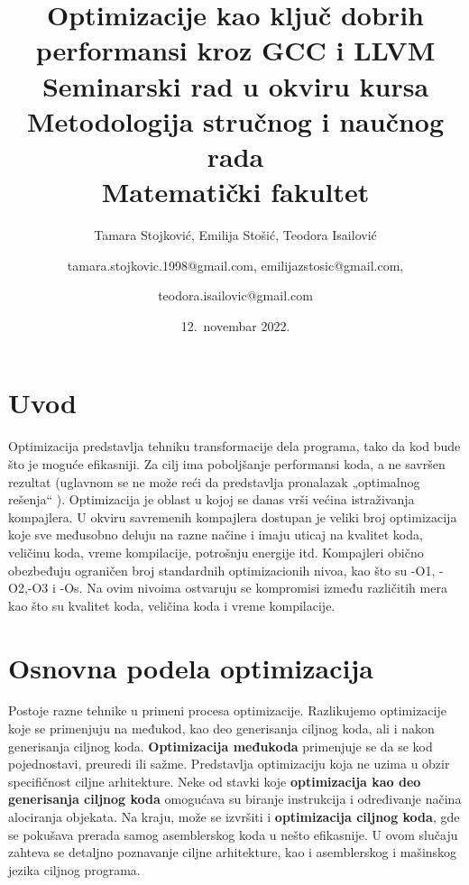 \documentclass[a4paper]{article}
\begin{document}
\title{Optimizacije kao ključ dobrih performansi kroz GCC i LLVM\\ \small{Seminarski rad u okviru kursa\\Metodologija stručnog i naučnog rada\\ Matematički fakultet}}

\author{Tamara Stojković, Emilija Stošić, Teodora Isailović \and tamara.stojkovic.1998@gmail.com, emilijazstosic@gmail.com, \and teodora.isailovic@gmail.com}
\date{12.~novembar 2022.}

\maketitle

\tableofcontents

\newpage

\section{Uvod}
\label{sec:uvod}
Optimizacija predstavlja tehniku transformacije dela programa,  tako da kod bude što je moguće efikasniji. 
Za cilj ima poboljšanje performansi koda, a ne savršen rezultat (uglavnom se ne može reći da predstavlja pronalazak „optimalnog rešenja“ ). 
Optimizacija je oblast u kojoj se danas vrši većina istraživanja kompajlera. 
U okviru savremenih kompajlera dostupan je veliki broj optimizacija koje sve međusobno deluju na razne načine i imaju uticaj na kvalitet koda, veličinu koda, vreme kompilacije, potrošnju energije itd. 
Kompajleri obično obezbeđuju ograničen broj  standardnih optimizacionih nivoa, kao što su -O1, -O2,-O3 i -Os. Na ovim nivoima ostvaruju se kompromisi između  različitih mera kao što su kvalitet koda, veličina koda i vreme kompilacije. \cite{uvod}

\section{Osnovna podela optimizacija}
\label{sec:podela}
Postoje razne tehnike u primeni procesa optimizacije. Razlikujemo optimizacije koje se primenjuju na međukod,  kao deo generisanja ciljnog koda, ali i nakon generisanja ciljnog koda.
\textbf{Optimizacija međukoda} primenjuje se da se kod pojednostavi, preuredi ili sažme. Predstavlja optimizaciju koja ne uzima u obzir specifičnost ciljne arhitekture.
Neke od stavki koje \textbf{optimizacija kao deo generisanja ciljnog koda} omogućava su biranje instrukcija i određivanje načina alociranja objekata. Na kraju, može se izvršiti i \textbf{optimizacija ciljnog koda}, gde se pokušava prerada samog asemblerskog koda u nešto efikasnije. 
U ovom slučaju zahteva se deta\-ljno poznavanje ciljne arhitekture, kao i asemblerskog i mašinskog jezika ciljnog programa. \cite{osnovnaPodela}
\end{document}
